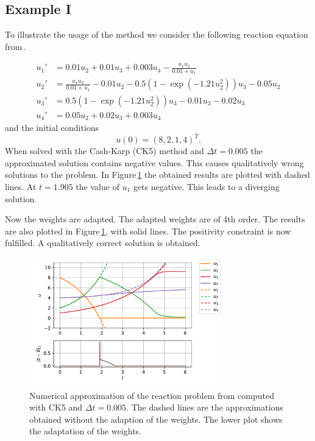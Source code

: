 \documentclass[a4paper]{article}
\numberwithin{equation}{section}
\theoremstyle{plain}
\theoremstyle{definition}
\numberwithin{theorem}{section}
\newcommand{\dt}{{\Delta t}}
\newcommand{\1}{\mathbbm{1}}
\begin{document}
\subsection{Example I}\label{sec:example_reac}

To illustrate the usage of the method we consider the following reaction equation from\,\cite{kopecz_comparison_2019}.

\begin{subequations}
\label{eq:Reaction}
\begin{align}
u_1' &= 0.01u_2 + 0.01 u_3 +0.003u_4 - \frac{u_1 u_2}{0.01+u_1} \\ 
u_2' &= \frac{u_1u_2}{0.01+u_1}-0.01 u_2-0.5(1-\exp(-1.21 u_2^2)) u_3 -0.05 u_2 \\ 
u_3' &= 0.5(1-\exp(-1.21u_2^2)) u_3 - 0.01 u_3 -0.02 u_3 \\ 
u_4' &=0.05 u_2 + 0.02 u_3 + 0.003u_4 
\end{align}
\end{subequations}
and the initial conditions
\begin{equation}
u(0) = (8,2,1,4)^T.
\end{equation}
When solved with the Cash-Karp (CK5) method and $\dt = 0.005$ the approximated solution contains negative values. This causes qualitatively wrong solutions to the problem. 
In Figure\,\ref{fig:exampleI} the obtained results are plotted with dashed lines. 
At $t=1.905$ the value of $u_1$ gets negative. This leads to a diverging solution.

Now the weights are adapted. The adapted weights are of 4th order. The results are also plotted in Figure\,\ref{fig:exampleI}, with solid lines. 
The positivity constraint is now fulfilled. A qualitatively correct solution is obtained.

\begin{figure}[ht]
    \centering
    \includegraphics[width=0.75\textwidth]{plots/exampleI.pdf}
    \caption{Numerical approximation of the reaction problem from \cite{kopecz_comparison_2019} computed with CK5 and $\dt = 0.005$. The dashed lines are the approximations obtained without the adaption of the weights. The lower plot shows the adaptation of the weights. }
    \label{fig:exampleI}
\end{figure}
\end{document}
